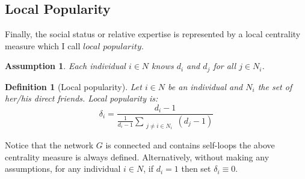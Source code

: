 \documentclass{article}
\newtheorem{definition}{Definition}
\newtheorem{assumption}{Assumption}
\begin{document}
\subsection{Local Popularity}
Finally, the social status or relative expertise is represented by a local centrality measure which I call $local$ $popularity$. 

\begin{assumption}
Each individual $i \in N$ knows $d_i$ and $d_j$ for all $j \in N_i$.
\end{assumption}

\begin{definition}[Local popularity] Let $i \in N$ be an individual and $N_i$ the set of her/his direct friends. Local popularity is: 
\begin{equation}
\delta_i = \frac{d_i -1}{\frac{1}{d_i -1 }\sum_{\substack{j \neq i \in N_i}} (d_j-1) }
\end{equation}
\label{localpopularity}
\end{definition}

\noindent Notice that the network $G$ is connected and contains self-loops the above centrality measure is always defined. Alternatively, without making any assumptions, for any individual $i \in N$,  if $d_i=1$ then set $\delta_i \equiv 0$. %
\end{document}
